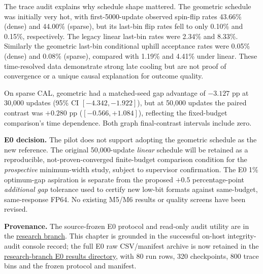 The trace audit explains why schedule shape mattered.
The geometric schedule was initially very hot,
with first-5000-update observed spin-flip rates
43.66\% (dense) and 44.00\% (sparse), but
its last-bin flip rates fell to only 0.10\%
and 0.15\%, respectively. The legacy linear
last-bin rates were 2.34\% and 8.33\%.
Similarly the geometric last-bin conditional
uphill acceptance rates were 0.05\% (dense)
and 0.08\% (sparse), compared with 1.19\%
and 4.41\% under linear. These time-resolved
data demonstrate strong late cooling but are
not proof of convergence or a unique causal
explanation for outcome quality.

On sparse CAL, geometric had a matched-seed
gap advantage of $-3.127$ pp at 30,000 updates
(95\% CI $[-4.342,-1.922]$), but at 50,000
updates the paired contrast was $+0.280$ pp
($[-0.566,+1.084]$), reflecting the fixed-budget
comparison's time dependence. Both graph
final-contrast intervals include zero.

\noindent\textbf{E0 decision.}
The pilot does not support adopting the geometric
schedule as the new reference. The original
50,000-update \emph{linear} schedule will be
retained as a reproducible, not-proven-converged
finite-budget comparison condition for the
\emph{prospective} minimum-width study, subject
to supervisor confirmation. The E0 1\% optimum-gap
aspiration is separate from the proposed $+0.5$
percentage-point \emph{additional gap} tolerance
used to certify new low-bit formats against
same-budget, same-response FP64. No existing M5/M6
results or quality screens have been revised.

\noindent\textbf{Provenance.}
The source-frozen E0 protocol and read-only audit
utility are in the
\href{https://github.com/Makise-okabe/MRAM_P-bit/tree/research/m4-gain-fusion-20261107}
{research branch}. This chapter is grounded in
the successful on-host integrity-audit console
record; the full E0 raw CSV/manifest archive is now
retained in the
\href{https://github.com/Makise-okabe/MRAM_P-bit/tree/research/m4-gain-fusion-20261107/results/e0_fp64_two_cal_20261112}
{research-branch E0 results directory}, with 80 run
rows, 320 checkpoints, 800 trace bins and the
frozen protocol and manifest.
